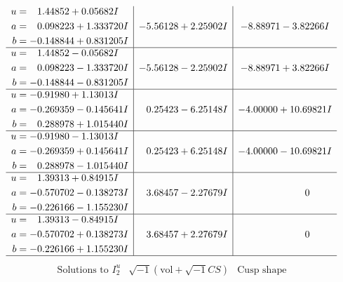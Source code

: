\documentclass[1p]{elsarticle_modified}
\theoremstyle{definition}
\newcommand{\I}{\sqrt{-1}}
\begin{document}
$$\begin{array}{c|c|c}
\begin{aligned}
u &= \phantom{-}1.44852 + 0.05682 I \\
a &= \phantom{-}0.098223 + 1.333720 I \\
b &= -0.148844 + 0.831205 I\end{aligned}
 & -5.56128 + 2.25902 I & -8.88971 - 3.82266 I \\ \hline\begin{aligned}
u &= \phantom{-}1.44852 - 0.05682 I \\
a &= \phantom{-}0.098223 - 1.333720 I \\
b &= -0.148844 - 0.831205 I\end{aligned}
 & -5.56128 - 2.25902 I & -8.88971 + 3.82266 I \\ \hline\begin{aligned}
u &= -0.91980 + 1.13013 I \\
a &= -0.269359 - 0.145641 I \\
b &= \phantom{-}0.288978 + 1.015440 I\end{aligned}
 & \phantom{-}0.25423 - 6.25148 I & -4.00000 + 10.69821 I \\ \hline\begin{aligned}
u &= -0.91980 - 1.13013 I \\
a &= -0.269359 + 0.145641 I \\
b &= \phantom{-}0.288978 - 1.015440 I\end{aligned}
 & \phantom{-}0.25423 + 6.25148 I & -4.00000 - 10.69821 I \\ \hline\begin{aligned}
u &= \phantom{-}1.39313 + 0.84915 I \\
a &= -0.570702 - 0.138273 I \\
b &= -0.226166 - 1.155230 I\end{aligned}
 & \phantom{-}3.68457 - 2.27679 I & \phantom{-0.000000 } 0 \\ \hline\begin{aligned}
u &= \phantom{-}1.39313 - 0.84915 I \\
a &= -0.570702 + 0.138273 I \\
b &= -0.226166 + 1.155230 I\end{aligned}
 & \phantom{-}3.68457 + 2.27679 I & \phantom{-0.000000 } 0\\
 \hline 
 \end{array}$$\newpage$$\begin{array}{c|c|c}  
\text{Solutions to }I^u_{2}& \I (\text{vol} + \sqrt{-1}CS) & \text{Cusp shape}\\
 \hline 
\begin{aligned}

\end{aligned}
\end{array}$$
\end{document}
